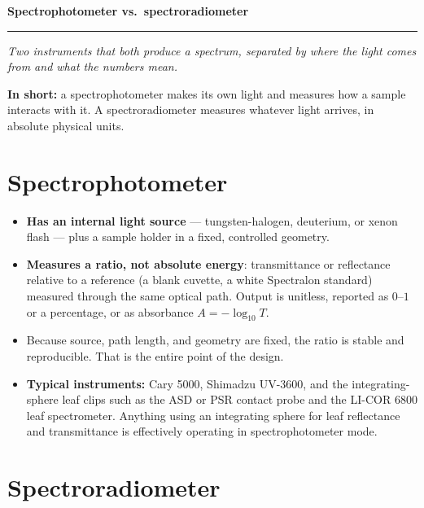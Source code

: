\documentclass[11pt,letterpaper]{article}
\begin{document}
{\noindent\color{titledark}\LARGE\bfseries Spectrophotometer vs.\ spectroradiometer\par}
\vspace{0.4em}
{\noindent\color{rulegray}\rule{\textwidth}{0.8pt}\par}
\vspace{0.5em}
{\noindent\color{muted}\itshape Two instruments that both produce a spectrum, separated by where the
light comes from and what the numbers mean.\par}
\vspace{1.2em}

\noindent\textbf{In short:} a spectrophotometer makes its own light and measures how a sample
interacts with it. A spectroradiometer measures whatever light arrives, in absolute physical units.

\section{Spectrophotometer}

\begin{itemize}
  \item \textbf{Has an internal light source} --- tungsten-halogen, deuterium, or xenon flash ---
        plus a sample holder in a fixed, controlled geometry.
  \item \textbf{Measures a ratio, not absolute energy}: transmittance or reflectance relative to a
        reference (a blank cuvette, a white Spectralon standard) measured through the same optical
        path. Output is unitless, reported as $0$--$1$ or a percentage, or as absorbance
        $A = -\log_{10} T$.
  \item Because source, path length, and geometry are fixed, the ratio is stable and reproducible.
        That is the entire point of the design.
  \item \textbf{Typical instruments:} Cary 5000, Shimadzu UV-3600, and the integrating-sphere leaf
        clips such as the ASD or PSR contact probe and the LI-COR 6800 leaf spectrometer. Anything
        using an integrating sphere for leaf reflectance and transmittance is effectively operating
        in spectrophotometer mode.
\end{itemize}

\section{Spectroradiometer}
\end{document}
